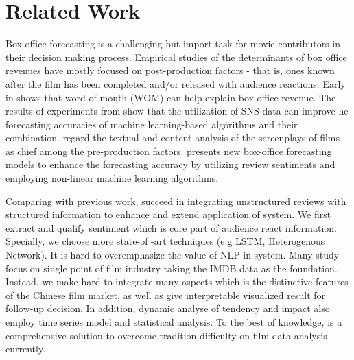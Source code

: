 \section{Related Work}
\label{sec:related}
\par Box-office forecasting is a challenging but import task for movie contributors in their decision making process. Empirical studies of the determinants of box office revenues have mostly focused on post-production factors - that is, ones known after the film has been completed and/or released with audience reactions. Early in \cite{liu2006word} shows that word of mouth (WOM) can help explain box office revenue. The results of experiments from \cite{kim2015box} show that the utilization of SNS data can improve he forecasting accuracies of machine learning-based algorithms and their combination. \cite{hunter2016predicting} regard the textual and content analysis of the screenplays of films as chief among the pre-production factors. \cite{hur2016box} presents new box-office forecasting models to enhance the forecasting accuracy by utilizing review sentiments and employing non-linear machine learning algorithms.

\par Comparing with previous work, \system succeed in integrating unstructured reviews with structured information to enhance and extend application of system. We first extract and qualify sentiment which is core part of audience react information. Specially, we choose more state-of -art techniques (e.g LSTM\cite{katiyar2016investigating}, Heterogenous Network\cite{sun2012when}). It is hard to overemphasize the value of NLP in system. Many study \cite{kim2015box,hur2016box,tang2015target-dependent} focus on single point of film industry taking the IMDB data as the foundation. Instead, we make hard to integrate many aspects which is the distinctive features of the Chinese film market, as well as give interpretable visualized result for follow-up decision. In addition, dynamic analyse of tendency and impact also employ time series model and statistical analysis. To the best of knowledge, \system is a comprehensive solution to overcome tradition difficulty on film data analysis currently.

